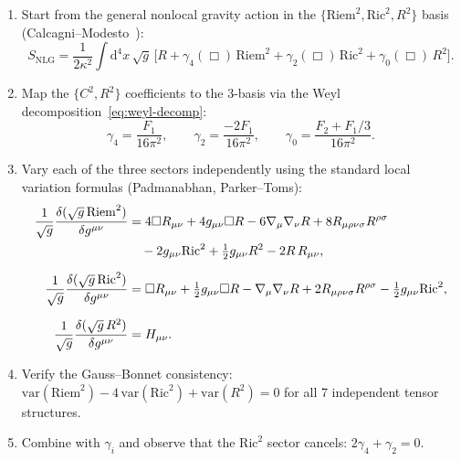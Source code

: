 \documentclass[11pt,a4paper]{article}
\renewcommand{\dd}{\mathrm{d}}
\theoremstyle{plain}
\theoremstyle{definition}
\begin{document}
\begin{enumerate}[nosep]
  \item Start from the general nonlocal gravity action in the
    $\{\mathrm{Riem}^2, \mathrm{Ric}^2, R^2\}$ basis
    (Calcagni--Modesto~\cite{CM22}):
    \begin{equation}\label{eq:S-3basis}
      S_{\mathrm{NLG}} = \frac{1}{2\kappa^2}\int\dd^4 x\,\sqrt{g}\,
      \bigl[R + \gamma_4(\Box)\,\mathrm{Riem}^2
      + \gamma_2(\Box)\,\mathrm{Ric}^2
      + \gamma_0(\Box)\,R^2\bigr].
    \end{equation}
  \item Map the $\{C^2, R^2\}$ coefficients to the 3-basis via
    the Weyl decomposition~\eqref{eq:weyl-decomp}:
    \begin{equation}\label{eq:gamma-map}
      \gamma_4 = \frac{F_1}{16\pi^2},
      \qquad
      \gamma_2 = \frac{-2F_1}{16\pi^2},
      \qquad
      \gamma_0 = \frac{F_2 + F_1/3}{16\pi^2}.
    \end{equation}
  \item Vary each of the three sectors independently using the
    standard local variation formulas (Padmanabhan, Parker--Toms):
    \begin{align}
      \frac{1}{\sqrt{g}}\frac{\delta(\sqrt{g}\,\mathrm{Riem}^2)}
        {\delta g^{\mu\nu}}
      &= 4\Box R_{\mu\nu} + 4g_{\mu\nu}\Box R
        - 6\nabla_\mu\nabla_\nu R
        + 8R_{\mu\rho\nu\sigma}R^{\rho\sigma}\notag\\
      &\quad - 2g_{\mu\nu}\mathrm{Ric}^2
        + \tfrac{1}{2}g_{\mu\nu}R^2
        - 2R\,R_{\mu\nu}, \label{eq:var-riem}\\[6pt]
      \frac{1}{\sqrt{g}}\frac{\delta(\sqrt{g}\,\mathrm{Ric}^2)}
        {\delta g^{\mu\nu}}
      &= \Box R_{\mu\nu} + \tfrac{1}{2}g_{\mu\nu}\Box R
        - \nabla_\mu\nabla_\nu R
        + 2R_{\mu\rho\nu\sigma}R^{\rho\sigma}
        - \tfrac{1}{2}g_{\mu\nu}\mathrm{Ric}^2, \label{eq:var-ric}\\[6pt]
      \frac{1}{\sqrt{g}}\frac{\delta(\sqrt{g}\,R^2)}{\delta g^{\mu\nu}}
      &= H_{\mu\nu}. \label{eq:var-r2}
    \end{align}
  \item Verify the Gauss--Bonnet consistency:
    $\mathrm{var}(\mathrm{Riem}^2) - 4\,\mathrm{var}(\mathrm{Ric}^2)
    + \mathrm{var}(R^2) = 0$ for all 7 independent tensor structures.
  \item Combine with $\gamma_i$ and observe that the $\mathrm{Ric}^2$
    sector cancels: $2\gamma_4 + \gamma_2 = 0$.
\end{enumerate}
\end{document}
